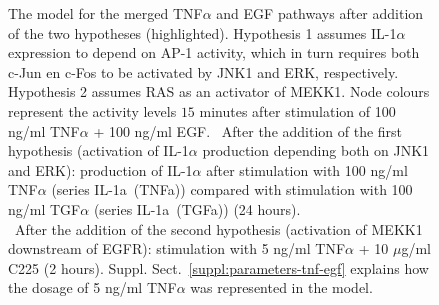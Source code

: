 \begin{figure}[!tpb]
\begin{center}
\end{center}
\caption{\scriptsize
{\bf \protect{}} The model for the merged TNF$\alpha$ and EGF pathways
after addition of the two hypotheses (highlighted). 
Hypothesis 1 assumes IL-1$\alpha$ expression to depend on AP-1 activity, which in turn requires 
both c-Jun en c-Fos to be activated by JNK1 and ERK, respectively. Hypothesis 2 assumes RAS as an activator 
of MEKK1. Node colours represent the activity levels $15$ minutes
after stimulation of 100 ng/ml TNF$\alpha$ + 100 ng/ml EGF.
{\bf \protect{}}~After the addition of the first hypothesis (activation of IL-1$\alpha$ production depending both
on JNK1 and ERK): production of IL-1$\alpha$ after stimulation with 100 ng/ml TNF$\alpha$ (series {\sf IL-1a~(TNFa)})
compared with stimulation with 100 ng/ml TGF$\alpha$ (series {\sf IL-1a~(TGFa)}) (24 hours).\\
{\bf \protect{}}~After the addition of the second hypothesis (activation of MEKK1 downstream of EGFR):
stimulation with 5 ng/ml TNF$\alpha$ + 10 $\mu$g/ml C225 (2 hours).
Suppl. Sect.~\ref{suppl:parameters-tnf-egf} explains how the dosage of 5 ng/ml TNF$\alpha$ was represented in the model.}\label{fig:large-model-graph}
\end{figure}


